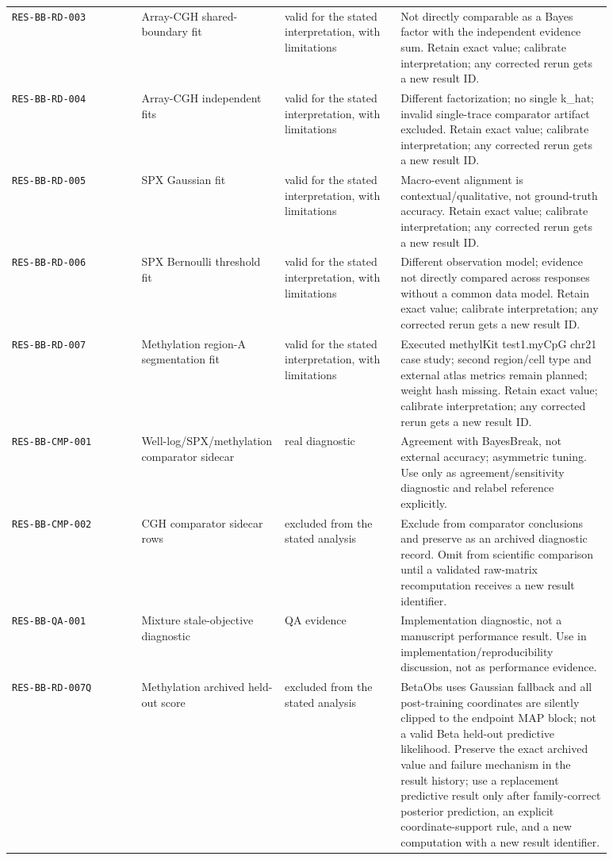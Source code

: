 \begin{longtable}{@{}p{0.19\linewidth}p{0.21\linewidth}p{0.17\linewidth}p{0.31\linewidth}@{}}
\texttt{RES-BB-RD-003} & Array-CGH shared-boundary fit & valid for the stated interpretation, with limitations & Not directly comparable as a Bayes factor with the independent evidence sum. Retain exact value; calibrate interpretation; any corrected rerun gets a new result ID. \\
\texttt{RES-BB-RD-004} & Array-CGH independent fits & valid for the stated interpretation, with limitations & Different factorization; no single k\_hat; invalid single-trace comparator artifact excluded. Retain exact value; calibrate interpretation; any corrected rerun gets a new result ID. \\
\texttt{RES-BB-RD-005} & SPX Gaussian fit & valid for the stated interpretation, with limitations & Macro-event alignment is contextual/qualitative, not ground-truth accuracy. Retain exact value; calibrate interpretation; any corrected rerun gets a new result ID. \\
\texttt{RES-BB-RD-006} & SPX Bernoulli threshold fit & valid for the stated interpretation, with limitations & Different observation model; evidence not directly compared across responses without a common data model. Retain exact value; calibrate interpretation; any corrected rerun gets a new result ID. \\
\texttt{RES-BB-RD-007} & Methylation region-A segmentation fit & valid for the stated interpretation, with limitations & Executed methylKit test1.myCpG chr21 case study; second region/cell type and external atlas metrics remain planned; weight hash missing. Retain exact value; calibrate interpretation; any corrected rerun gets a new result ID. \\
\texttt{RES-BB-CMP-001} & Well-log/SPX/methylation comparator sidecar & real diagnostic & Agreement with BayesBreak, not external accuracy; asymmetric tuning. Use only as agreement/sensitivity diagnostic and relabel reference explicitly. \\
\texttt{RES-BB-CMP-002} & CGH comparator sidecar rows & excluded from the stated analysis & Exclude from comparator conclusions and preserve as an archived diagnostic record. Omit from scientific comparison until a validated raw-matrix recomputation receives a new result identifier. \\
\texttt{RES-BB-QA-001} & Mixture stale-objective diagnostic & QA evidence & Implementation diagnostic, not a manuscript performance result. Use in implementation/reproducibility discussion, not as performance evidence. \\
\texttt{RES-BB-RD-007Q} & Methylation archived held-out score & excluded from the stated analysis & BetaObs uses Gaussian fallback and all post-training coordinates are silently clipped to the endpoint MAP block; not a valid Beta held-out predictive likelihood. Preserve the exact archived value and failure mechanism in the result history; use a replacement predictive result only after family-correct posterior prediction, an explicit coordinate-support rule, and a new computation with a new result identifier. \\

\end{longtable}
